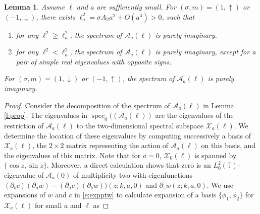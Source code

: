 \documentclass[12pt]{amsart}    %
\renewcommand{\geq}{\geqslant}
\newcommand{\Z}{\mathbb{Z}}
\newcommand{\oneu}{(1,\uparrow)}
\newcommand{\oned}{(1,\downarrow)}
\newcommand{\minu}{(-1,\uparrow)}
\newcommand{\mind}{(-1,\downarrow)}
\newtheorem{lemma}[theorem]{Lemma}
\numberwithin{equation}{section}
\begin{document}
\begin{lemma}\label{lem:long}
Assume $\ell$ and $a$ are sufficiently small. For $(\sigma,m)=\oneu$ or $\mind$, there exists $\ell_a^2 = \sigma A_2a^2+O(a^4)>0$, such that 
\begin{enumerate}
    \item for any $\ell^2\geq \ell_a^2$, the spectrum of $\mathcal A_a(\ell)$ is purely imaginary.
    \item for any $\ell^2< \ell_a^2$, the spectrum of $\mathcal A_a(\ell)$ is purely imaginary, except for a pair of simple real eigenvalues with opposite signs.
\end{enumerate}
For $(\sigma,m)=\oned$ or $\minu$, the spectrum of $\mathcal{A}_a(\ell)$ is purely imaginary.
\end{lemma}
\begin{proof}
Consider the decomposition of the spectrum of $\mathcal A_a(\ell)$ in Lemma \ref{l:prop}.
The eigenvalues in
$\operatorname{spec}_0((\mathcal A_a(\ell))$ are the eigenvalues of 
the restriction of $\mathcal A_a(\ell)$ to the two-dimensional spectral subspace $\mathcal X_a(\ell)$. We determine the location of these
eigenvalues by computing successively
a basis of  $\mathcal X_a(\ell)$, 
the $2\times2$ matrix representing the action of $\mathcal A_a(\ell)$
on this basis, and the eigenvalues of this matrix. Note that for $a=0$, $\mathcal{X}_0(\ell)$ is spanned by $\{\cos z, \sin z\}$. Moreover, a direct calculation shows that 
zero is an  $L^2_0(\mathbb{T})$-eigenvalue of $\mathcal{A}_a(0)$ 
of multiplicity two with eigenfunctions $(\partial_b c)(\partial_a w)-(\partial_a c)(\partial_b w))(z;k,a,0)$ and $\partial_z w(z;k,a,0)$. We use expansions of $w$ and $c$ in \eqref{e:expptw} to calculate expansion of a basis $\{\phi_1,\phi_2\}$ for $\mathcal{X}_a(\ell)$ for small $a$ and $\ell$ as

\end{proof}
\end{document}
